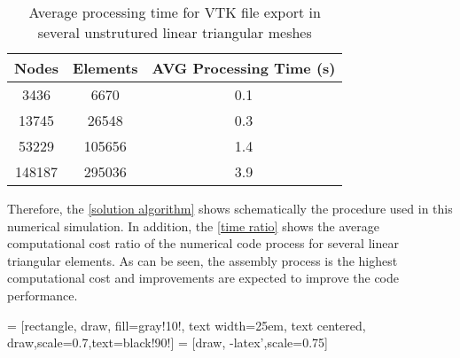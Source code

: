 \vspace{0.5cm}
\begin{table}[H]
\centering
\begin{tabular}{ccc}
\toprule
\textbf{Nodes} & \textbf{Elements} & \textbf{AVG Processing Time} (s) \\
\midrule
3436 & 6670 & 0.1 \\
13745 & 26548 & 0.3 \\
53229 & 105656 & 1.4 \\
148187 & 295036 & 3.9 \\



\bottomrule
\end{tabular}
\caption{Average processing time for VTK file export in several unstrutured linear triangular meshes}
\label{tempo export vtk}
\end{table}

\medskip
Therefore, the \ref{solution algorithm} shows schematically the procedure used
in this numerical simulation.
In addition, the \ref{time ratio} shows the average computational
cost ratio
of the numerical code process for several linear triangular elements. 
As can be seen,
the assembly process is the highest computational cost
and improvements are expected to improve the code performance.



\vspace{0.5cm}
 = [rectangle, draw, fill=gray!10!,
    text width=25em, text centered, draw,scale=0.7,text=black!90!]
 = [draw, -latex',scale=0.75]



